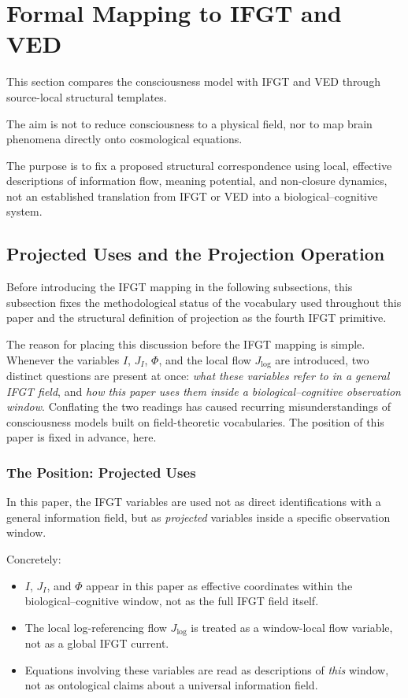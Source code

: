 \section{Formal Mapping to IFGT and VED}


This section compares the consciousness model with IFGT and VED through source-local structural templates.

The aim is not to reduce consciousness to a physical field, nor to map brain phenomena directly onto cosmological equations.

The purpose is to fix a proposed structural correspondence using local, effective descriptions of information flow, meaning potential, and non-closure dynamics, not an established translation from IFGT or VED into a biological--cognitive system.

\subsection{Projected Uses and the Projection Operation}
\label{sec:projected-uses}

Before introducing the IFGT mapping in the following subsections, this
subsection fixes the methodological status of the vocabulary used
throughout this paper and the structural definition of projection as
the fourth IFGT primitive.

The reason for placing this discussion before the IFGT mapping is
simple. Whenever the variables \(I\), \(J_I\), \(\Phi\), and the local
flow \(J_{\mathrm{log}}\) are introduced, two distinct questions are
present at once: \emph{what these variables refer to in a general IFGT
field}, and \emph{how this paper uses them inside a biological--cognitive
observation window}. Conflating the two readings has caused recurring
misunderstandings of consciousness models built on field-theoretic
vocabularies. The position of this paper is fixed in advance, here.

\subsubsection{The Position: Projected Uses}
\label{sec:projected-uses-stance}

In this paper, the IFGT variables are used not as direct identifications
with a general information field, but as \emph{projected} variables
inside a specific observation window.

Concretely:

\begin{itemize}
  \item \(I\), \(J_I\), and \(\Phi\) appear in this paper as effective
        coordinates within the biological--cognitive window, not as the
        full IFGT field itself.
  \item The local log-referencing flow \(J_{\mathrm{log}}\) is treated as
        a window-local flow variable, not as a global IFGT current.
  \item Equations involving these variables are read as descriptions of
        \emph{this} window, not as ontological claims about a universal
        information field.
\end{itemize}

